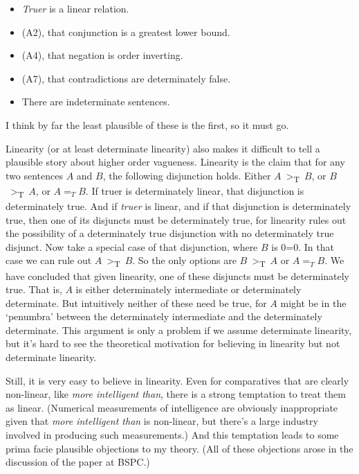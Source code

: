 \begin{itemize}
\item \textit{Truer} is a linear relation. 
\item (A2), that conjunction is a greatest lower bound. 
\item (A4), that negation is order inverting. 
\item (A7), that contradictions are determinately false. 
\item There are indeterminate sentences. 
\end{itemize}

\noindent I think by far the least plausible of these is the first, so it must go.

Linearity (or at least determinate linearity) also makes it difficult to tell a plausible story about higher order vagueness. Linearity is the claim that for any two sentences \(A\) and \(B\), the following disjunction holds. Either \(A\)~{\textgreater}\textsubscript{T}~\(B\), or \(B\)~{\textgreater}\textsubscript{T}~\(A\), or \(A =_T B\). If truer is determinately linear, that disjunction is determinately true. And if \textit{truer} is linear, and if that disjunction is determinately true, then one of its disjuncts must be determinately true, for linearity rules out the possibility of a determinately true disjunction with no determinately true disjunct. Now take a special case of that disjunction, where \(B\) is 0=0. In that case we can rule out \(A\)~{\textgreater}\textsubscript{T}~\(B\). So the only options are \(B\)~{\textgreater}\textsubscript{T}~\(A\) or \(A =_T B\). We have concluded that given linearity, one of these disjuncts must be determinately true. That is, \(A\) is either determinately intermediate or determinately determinate. But intuitively neither of these need be true, for \(A\) might be in the `penumbra' between the determinately intermediate and the determinately determinate. This argument is only a problem if we assume determinate linearity, but it's hard to see the theoretical motivation for believing in linearity but not determinate linearity.

Still, it is very easy to believe in linearity. Even for comparatives that are clearly non-linear, like \textit{more intelligent than}, there is a strong temptation to treat them as linear. (Numerical measurements of intelligence are obviously inappropriate given that \textit{more intelligent than} is non-linear, but there's a large industry involved in producing such measurements.) And this temptation leads to some prima facie plausible objections to my theory. (All of these objections arose in the discussion of the paper at BSPC.)

